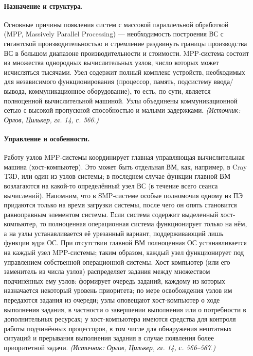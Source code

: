 \documentclass[a4paper,12pt]{article}
\begin{document}
\paragraph{Назначение и структура.}
Основные причины появления систем с массовой параллельной обработкой (MPP, Massively Parallel Processing) — необходимость построения ВС с гигантской производительностью и стремление раздвинуть границы производства ВС в большом диапазоне производительности и стоимости. MPP-система состоит из множества однородных вычислительных узлов, число которых может исчисляться тысячами. Узел содержит полный комплекс устройств, необходимых для независимого функционирования (процессор, память, подсистему ввода/вывода, коммуникационное оборудование), то есть, по сути, является полноценной вычислительной машиной. Узлы объединены коммуникационной сетью с высокой пропускной способностью и малыми задержками.
\textit{(Источник: Орлов, Цилькер, гл. 14, с. 566.)}

\paragraph{Управление и особенности.}
Работу узлов MPP-системы координирует главная управляющая вычислительная машина (хост-компьютер). Это может быть отдельная ВМ, как, например, в Cray T3D, или один из узлов системы; в последнем случае функции главной ВМ возлагаются на какой-то определённый узел ВС (в течение всего сеанса вычислений). Напомним, что в SMP-системе особые полномочия одному из ПЭ придаются только на время загрузки системы, после чего он опять становится равноправным элементом системы. Если система содержит выделенный хост-компьютер, то полноценная операционная система функционирует только на нём, а на узлы устанавливается её урезанный вариант, поддерживающий лишь функции ядра ОС. При отсутствии главной ВМ полноценная ОС устанавливается на каждый узел MPP-системы; таким образом, каждый узел функционирует под управлением собственной операционной системы. Хост-компьютер (или его заменитель из числа узлов) распределяет задания между множеством подчинённых ему узлов: формирует очередь заданий, каждому из которых назначается некоторый уровень приоритета; по мере освобождения узлов им передаются задания из очереди; узлы оповещают хост-компьютер о ходе выполнения задания, в частности о завершении выполнения или о потребности в дополнительных ресурсах; у хост-компьютера имеются средства для контроля работы подчинённых процессоров, в том числе для обнаружения нештатных ситуаций и прерывания выполнения задания в случае появления более приоритетной задачи.
\textit{(Источник: Орлов, Цилькер, гл. 14, с. 566--567.)}
\end{document}
